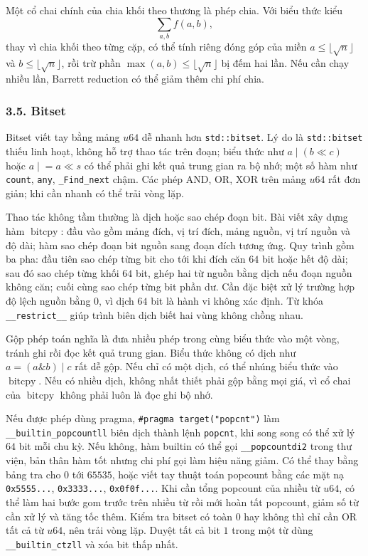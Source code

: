 \documentclass[11pt]{article}
\begin{document}
Một cổ chai chính của chia khối theo thương là phép chia. Với biểu thức kiểu
\[
  \sum_{a,b} f(a,b),
\]
thay vì chia khối theo từng cặp, có thể tính riêng đóng góp của miền
\(a\le \lfloor\sqrt n\rfloor\) và \(b\le \lfloor\sqrt n\rfloor\), rồi trừ phần
\(\max(a,b)\le \lfloor\sqrt n\rfloor\) bị đếm hai lần. Nếu cần chạy nhiều lần,
Barrett reduction có thể giảm thêm chi phí chia.

\subsubsection*{3.5. Bitset}

Bitset viết tay bằng mảng \(u64\) dễ nhanh hơn \texttt{std::bitset}. Lý do là
\texttt{std::bitset} thiếu linh hoạt, không hỗ trợ thao tác trên đoạn; biểu
thức như \(a \mid (b \ll c)\) hoặc \(a \mathrel{|}= a \ll s\) có thể phải ghi
kết quả trung gian ra bộ nhớ; một số hàm như \texttt{count}, \texttt{any},
\texttt{\_Find\_next} chậm. Các phép AND, OR, XOR trên mảng \(u64\) rất đơn
giản; khi cần nhanh có thể trải vòng lặp.

Thao tác không tầm thường là dịch hoặc sao chép đoạn bit. Bài viết xây dựng
hàm \(\operatorname{bitcpy}\): đầu vào gồm mảng đích, vị trí đích, mảng nguồn,
vị trí nguồn và độ dài; hàm sao chép đoạn bit nguồn sang đoạn đích tương ứng.
Quy trình gồm ba pha: đầu tiên sao chép từng bit cho tới khi đích căn \(64\)
bit hoặc hết độ dài; sau đó sao chép từng khối \(64\) bit, ghép hai từ nguồn
bằng dịch nếu đoạn nguồn không căn; cuối cùng sao chép từng bit phần dư. Cần
đặc biệt xử lý trường hợp độ lệch nguồn bằng \(0\), vì dịch \(64\) bit là hành
vi không xác định. Từ khóa \texttt{\_\_restrict\_\_} giúp trình biên dịch biết
hai vùng không chồng nhau.

Gộp phép toán nghĩa là đưa nhiều phép trong cùng biểu thức vào một vòng, tránh
ghi rồi đọc kết quả trung gian. Biểu thức không có dịch như \(a=(a\&b)\mid c\)
rất dễ gộp. Nếu chỉ có một dịch, có thể nhúng biểu thức vào \(\operatorname{bitcpy}\).
Nếu có nhiều dịch, không nhất thiết phải gộp bằng mọi giá, vì cổ chai của
\(\operatorname{bitcpy}\) không phải luôn là đọc ghi bộ nhớ.

Nếu được phép dùng pragma, \texttt{\#pragma target("popcnt")} làm
\texttt{\_\_builtin\_popcountll} biên dịch thành lệnh \texttt{popcnt}, khi song
song có thể xử lý \(64\) bit mỗi chu kỳ. Nếu không, hàm builtin có thể gọi
\texttt{\_\_popcountdi2} trong thư viện, bản thân hàm tốt nhưng chi phí gọi làm
hiệu năng giảm. Có thể thay bằng bảng tra cho \(0\) tới \(65535\), hoặc viết
tay thuật toán popcount bằng các mặt nạ
\texttt{0x5555...}, \texttt{0x3333...}, \texttt{0x0f0f...}. Khi cần tổng
popcount của nhiều từ \(u64\), có thể làm hai bước gom trước trên nhiều từ rồi
mới hoàn tất popcount, giảm số từ cần xử lý và tăng tốc thêm. Kiểm tra bitset
có toàn \(0\) hay không thì chỉ cần OR tất cả từ \(u64\), nên trải vòng lặp.
Duyệt tất cả bit \(1\) trong một từ dùng \texttt{\_\_builtin\_ctzll} và xóa
bit thấp nhất.
\end{document}
